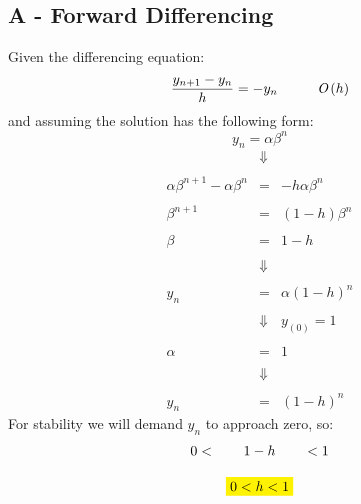 \documentclass[11pt, a4paper]{article}
\begin{document}
\subsection{A - Forward Differencing}
Given the differencing equation:
\begin{equation}
    \frac{y_{n+1}-y_n}{h}=-y_n\hspace{1cm}\emph{O}\left(h\right)
\end{equation}
and assuming the solution has the following form:
\begin{equation}
    y_n=\alpha\beta^n
\end{equation}
\begin{equation}
    \begin{array}{rcl}
        & \Downarrow & \\\\
        \alpha\beta^{n+1}-\alpha\beta^n & = & -h\alpha\beta^n \\\\
        \beta^{n+1} & = & \left(1-h\right)\beta^n \\\\
        \beta & = & 1-h \\\\
        & \Downarrow & \\\\
        y_n & = & \alpha\left(1-h\right)^n \\\\
        & \Downarrow & y_{\left(0\right)}=1 \\\\
        \alpha & = & 1 \\\\
        & \Downarrow & \\\\
        y_n & = & \left(1-h\right)^n
    \end{array}
\end{equation}
For stability we will demand $y_n$ to approach zero, so:
\begin{equation}
    \begin{array}{rcl}
        0<&1-h&<1 \\\\
        &\colorbox{yellow}{$0<h<1$}&
    \end{array}
\end{equation}
\end{document}
